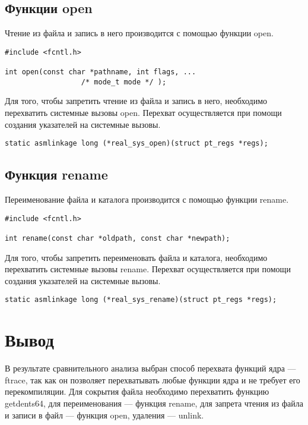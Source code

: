\subsection{Функции open}
Чтение из файла и запись в него производится с помощью функции open.

\begin{lstlisting}[label=code:open,caption=Функция open]
#include <fcntl.h>

int open(const char *pathname, int flags, ...
                  /* mode_t mode */ );
\end{lstlisting}
Для того, чтобы запретить чтение из файла и запись в него, необходимо перехватить системные вызовы open.
Перехват осуществляется при помощи создания указателей на системные вызовы.

\begin{lstlisting}[label=code:unlink_p,caption=Указатели на open{,} write и read.]
static asmlinkage long (*real_sys_open)(struct pt_regs *regs);
\end{lstlisting}


\subsection{Функция rename}
Переименование файла и каталога производится с помощью функции rename.

\begin{lstlisting}[label=code:rename,caption=Функция rename]
#include <fcntl.h>

int rename(const char *oldpath, const char *newpath);
\end{lstlisting}
Для того, чтобы запретить переименовать файла и каталога, необходимо перехватить системные вызовы rename.
Перехват осуществляется при помощи создания указателей на системные вызовы.

\begin{lstlisting}[label=code:rename_p,caption=Указатели на rename]
static asmlinkage long (*real_sys_rename)(struct pt_regs *regs);
\end{lstlisting}



\section*{Вывод}

В результате сравнительного анализа выбран способ перехвата функций ядра --- ftrace, так как он позволяет перехватывать любые функции ядра и не требует его перекомпиляции.
Для сокрытия файла необходимо перехватить функцию getdents64, для переименования --- функция rename, для запрета чтения из файла и записи в файл --- функция open, удаления --- unlink.